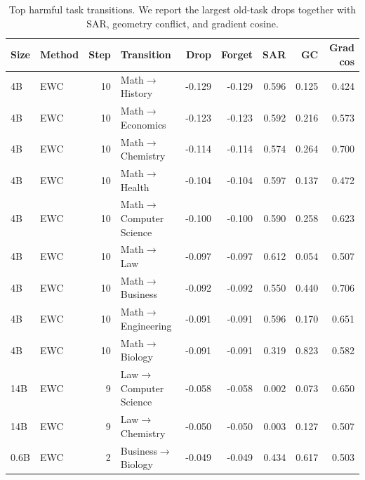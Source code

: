\documentclass{article}
\begin{document}
\begin{table}[!htbp]
  \centering
  \caption{
  {Top harmful task transitions.}
  We report the largest old-task drops together with SAR, geometry conflict, and gradient cosine.
  }
  \label{tab:app_top_harmful_pairs_full}
  \scriptsize
  \setlength{\tabcolsep}{4pt}
{
\renewcommand{\arraystretch}{1.06}
\begin{tabular}{llrlrrrrr}
\toprule[0.9pt]
\rowcolor{sizeBand}
Size & Method & Step & Transition & Drop & Forget & SAR & GC & Grad cos \\
\midrule
\rowcolor{rcwmBlue} 4B & EWC & 10 & Math$\rightarrow$History & -0.129 & -0.129 & 0.596 & 0.125 & 0.424 \\
\rowcolor{rcwmBlue} 4B & EWC & 10 & Math$\rightarrow$Economics & -0.123 & -0.123 & 0.592 & 0.216 & 0.573 \\
\rowcolor{rcwmBlue} 4B & EWC & 10 & Math$\rightarrow$Chemistry & -0.114 & -0.114 & 0.574 & 0.264 & 0.700 \\
\rowcolor{mergeBlue} 4B & EWC & 10 & Math$\rightarrow$Health & -0.104 & -0.104 & 0.597 & 0.137 & 0.472 \\
\rowcolor{mergeBlue} 4B & EWC & 10 & Math$\rightarrow$Computer Science & -0.100 & -0.100 & 0.590 & 0.258 & 0.623 \\
\rowcolor{mergeBlue} 4B & EWC & 10 & Math$\rightarrow$Law & -0.097 & -0.097 & 0.612 & 0.054 & 0.507 \\
\rowcolor{refGray} 4B & EWC & 10 & Math$\rightarrow$Business & -0.092 & -0.092 & 0.550 & 0.440 & 0.706 \\
\rowcolor{refGray} 4B & EWC & 10 & Math$\rightarrow$Engineering & -0.091 & -0.091 & 0.596 & 0.170 & 0.651 \\
\rowcolor{refGray} 4B & EWC & 10 & Math$\rightarrow$Biology & -0.091 & -0.091 & 0.319 & 0.823 & 0.582 \\
\midrule
\rowcolor{mergeBlue} 14B & EWC & 9 & Law$\rightarrow$Computer Science & -0.058 & -0.058 & 0.002 & 0.073 & 0.650 \\
\rowcolor{mergeBlue} 14B & EWC & 9 & Law$\rightarrow$Chemistry & -0.050 & -0.050 & 0.003 & 0.127 & 0.507 \\
\rowcolor{refGray} 0.6B & EWC & 2 & Business$\rightarrow$Biology & -0.049 & -0.049 & 0.434 & 0.617 & 0.503 \\
\bottomrule[0.9pt]
\end{tabular}
}

\end{table}
\end{document}
